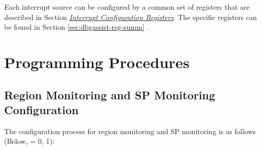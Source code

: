 \documentclass[main\_\_EN.tex]{subfiles}
\begin{document}
Each interrupt source can be configured by a common set of registers that are described in Section \hyperref[interrupt-config-registers]{\textit{Interrupt Configuration Registers}}. The specific registers can be found in Section \ref{sec:dbgassist-reg-summ} \textit{}.

\section{Programming Procedures}
\label{sec:dbgassist-prog-procedures}

\subsection{Region Monitoring and SP Monitoring Configuration}

The configuration process for region monitoring and SP monitoring is as follows (Below,  = 0, 1):
\end{document}
